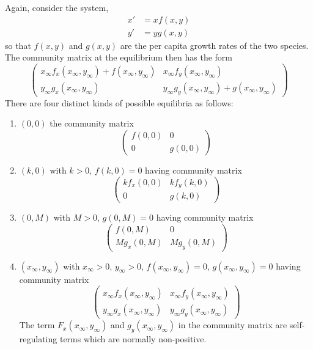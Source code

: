 \documentclass[../main-sheet.tex]{subfiles}
\begin{document}
\begin{soln}
    Again, consider the system,
    \begin{align*}
        x'&=xf(x,y)\\
        y'&=yg(x,y)
    \end{align*}
    so that \(f(x,y)\) and \(g(x,y)\) are the per capita growth rates of the two species. The community matrix at the equilibrium then has the form
    \[\begin{pmatrix}
        x_\infty f_x(x_\infty, y_\infty)+f(x_\infty, y_\infty)&x_\infty f_y(x_\infty, y_\infty)\\
        y_\infty g_x(x_\infty, y_\infty)&y_\infty g_y(x_\infty, y_\infty)+g(x_\infty, y_\infty)
    \end{pmatrix}\]
    There are four distinct kinds of possible equilibria as follows:
    \begin{enumerate}[label=(\roman*)]
        \item \((0,0)\) the community matrix
        \[\begin{pmatrix}
            f(0,0)&0\\
            0&g(0, 0)
        \end{pmatrix}\]
        \item \((k,0)\) with \(k>0\), \(f(k,0)=0\) having community matrix
        \[\begin{pmatrix}
            kf_x(0,0)&kf_y(k,0)\\
            0&g(k, 0)
        \end{pmatrix}\]
        \item \((0,M)\) with \(M>0\), \(g(0,M)=0\) having community matrix
        \[\begin{pmatrix}
            f(0,M)&0\\
            Mg_x(0,M)&Mg_y(0,M)
        \end{pmatrix}\]
        \item \((x_\infty, y_\infty)\) with \(x_\infty>0,\,y_\infty>0\), \(f(x_\infty, y_\infty)=0\), \(g(x_\infty, y_\infty)=0\) having community matrix
        \[\begin{pmatrix}
            x_\infty f_x(x_\infty, y_\infty)&x_\infty f_y(x_\infty, y_\infty)\\
            y_\infty g_x(x_\infty, y_\infty)&y_\infty g_y(x_\infty, y_\infty)
        \end{pmatrix}\]
        The term \(F_x(x_\infty, y_\infty)\) and \(g_y(x_\infty, y_\infty)\) in the community matrix are self-regulating terms which are normally non-positive.


\end{enumerate}
\end{soln}
\end{document}
